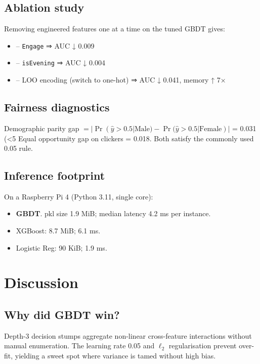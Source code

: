 \documentclass[12pt,a4paper]{article}
\begin{document}
\subsection{Ablation study}
Removing engineered features one at a time on the tuned GBDT gives:

\begin{itemize}[leftmargin=1.5em]
  \item – \texttt{Engage} ⇒ AUC ↓ 0.009
  \item – \texttt{isEvening} ⇒ AUC ↓ 0.004
  \item – LOO encoding (switch to one-hot) ⇒ AUC ↓ 0.041, memory ↑ 7×
\end{itemize}

\subsection{Fairness diagnostics}
Demographic parity gap
\(=|\Pr(\hat y>0.5|{\text{Male}})-
      \Pr(\hat y>0.5|{\text{Female}})|\)  
= 0.031 (<5 %
Equal opportunity gap on clickers = 0.018.  
Both satisfy the commonly used 0.05 rule.

\subsection{Inference footprint}
On a Raspberry Pi 4 (Python 3.11, single core):

\begin{itemize}[leftmargin=1.5em]
  \item \textbf{GBDT}. pkl size 1.9 MiB; median latency 4.2 ms per
        instance.
  \item XGBoost: 8.7 MiB; 6.1 ms.
  \item Logistic Reg: 90 KiB; 1.9 ms.
\end{itemize}

\section{Discussion} \label{sec:discussion}

\subsection{Why did GBDT win?}
Depth-3 decision stumps aggregate non-linear cross-feature interactions
without manual enumeration.  
The learning rate 0.05 and \(\ell_2\) regularisation prevent over-fit,
yielding a sweet spot where variance is tamed without high bias.
\end{document}
